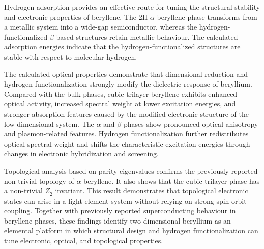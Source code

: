 Hydrogen adsorption provides an effective route for tuning the structural stability and electronic properties of beryllene.
The 2H-$\alpha$-beryllene phase transforms from a metallic system into a wide-gap semiconductor,
whereas the hydrogen-functionalized $\beta$-based structures retain metallic behaviour.
The calculated adsorption energies indicate that the hydrogen-functionalized structures are stable with respect to molecular hydrogen.

The calculated optical properties demonstrate that dimensional reduction and hydrogen functionalization strongly modify the dielectric response of beryllium.
Compared with the bulk phases,
cubic trilayer beryllene exhibits enhanced optical activity,
increased spectral weight at lower excitation energies,
and stronger absorption features caused by the modified electronic structure of the low-dimensional system.
The $\alpha$ and $\beta$ phases show pronounced optical anisotropy and plasmon-related features.
Hydrogen functionalization further redistributes optical spectral weight and shifts the characteristic excitation energies through changes in electronic hybridization and screening.

Topological analysis based on parity eigenvalues confirms the previously reported non-trivial topology of $\alpha$-beryllene.
It also shows that the cubic trilayer phase has a non-trivial $Z_{2}$ invariant.
This result demonstrates that topological electronic states can arise in a light-element system without relying on strong spin-orbit coupling.
Together with previously reported superconducting behaviour in beryllene phases,
these findings identify two-dimensional beryllium as an elemental platform in which structural design and hydrogen functionalization can tune electronic,
optical, and topological properties.
